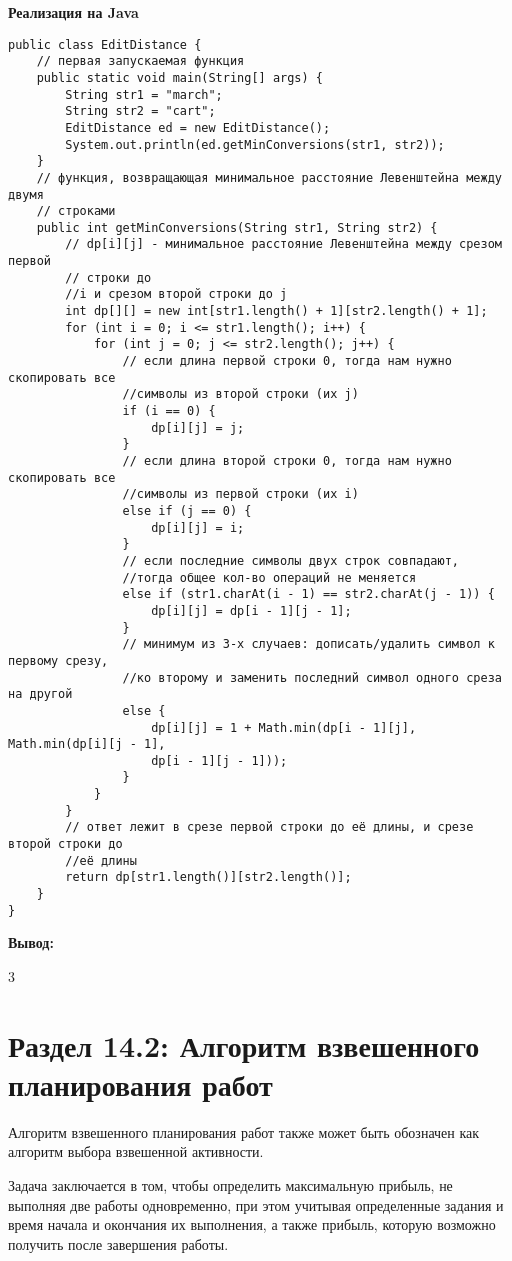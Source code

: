 \textbf{Реализация на Java}
\begin{tcolorbox}
\begin{verbatim}
public class EditDistance {	
	// первая запускаемая функция
	public static void main(String[] args) {
		String str1 = "march";
		String str2 = "cart";
		EditDistance ed = new EditDistance();
		System.out.println(ed.getMinConversions(str1, str2));
	}
	// функция, возвращающая минимальное расстояние Левенштейна между двумя 
	// строками
	public int getMinConversions(String str1, String str2) {
		// dp[i][j] - минимальное расстояние Левенштейна между срезом первой 
		// строки до
		//i и срезом второй строки до j
		int dp[][] = new int[str1.length() + 1][str2.length() + 1];
		for (int i = 0; i <= str1.length(); i++) {
			for (int j = 0; j <= str2.length(); j++) {
				// если длина первой строки 0, тогда нам нужно скопировать все 
				//символы из второй строки (их j)
				if (i == 0) {
					dp[i][j] = j;
				}
				// если длина второй строки 0, тогда нам нужно скопировать все 
				//символы из первой строки (их i)
				else if (j == 0) {
					dp[i][j] = i;
				}
				// если последние символы двух строк совпадают, 
				//тогда общее кол-во операций не меняется
				else if (str1.charAt(i - 1) == str2.charAt(j - 1)) {
					dp[i][j] = dp[i - 1][j - 1];
				}
				// минимум из 3-х случаев: дописать/удалить символ к первому срезу,
				//ко второму и заменить последний символ одного среза на другой
				else {
					dp[i][j] = 1 + Math.min(dp[i - 1][j], Math.min(dp[i][j - 1], 
					dp[i - 1][j - 1]));
				}
			}
		}
		// ответ лежит в срезе первой строки до её длины, и срезе второй строки до 
		//её длины
		return dp[str1.length()][str2.length()];
	}
}
\end{verbatim}
\end{tcolorbox}
\textbf{Вывод:}

\vspace{\baselineskip}

3

\section*{Раздел 14.2: Алгоритм взвешенного планирования работ}

Алгоритм взвешенного планирования работ также может быть обозначен как алгоритм выбора взвешенной активности.

\vspace{\baselineskip}

Задача заключается в том, чтобы определить максимальную прибыль, не выполняя две работы одновременно, при этом учитывая определенные задания и время начала и окончания их выполнения, а также прибыль, которую возможно получить после завершения работы.


